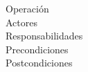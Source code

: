\begin{description}
\item[Operación] 
\item[Actores]
\item[Responsabilidades]
\item[Precondiciones]
\item[Postcondiciones]
\end{description}

